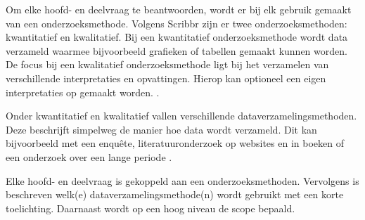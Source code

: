 
\renewcommand{\arraystretch}{1.35} %

Om elke hoofd- en deelvraag te beantwoorden, wordt er bij elk gebruik gemaakt van een onderzoeksmethode. Volgens Scribbr \cite{research-methods} zijn er twee onderzoeksmethoden: kwantitatief en kwalitatief. Bij een kwantitatief onderzoeksmethode wordt data verzameld waarmee bijvoorbeeld grafieken of tabellen gemaakt kunnen worden. De focus bij een kwalitatief onderzoeksmethode ligt bij het verzamelen van verschillende interpretaties en opvattingen. Hierop kan optioneel een eigen interpretaties op gemaakt worden. \cite{quantitative-vs-qualitative}.

Onder kwantitatief en kwalitatief vallen verschillende dataverzamelingsmethoden. Deze beschrijft simpelweg de manier hoe data wordt verzameld. Dit kan bijvoorbeeld met een enquête, literatuuronderzoek op websites en in boeken of een onderzoek over een lange periode \cite{quantitative-vs-qualitative}.

Elke hoofd- en deelvraag is gekoppeld aan een onderzoeksmethoden. Vervolgens is beschreven welk(e) dataverzamelingsmethode(n) wordt gebruikt met een korte toelichting. Daarnaast wordt op een hoog niveau de scope bepaald.

